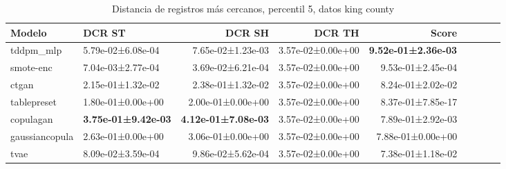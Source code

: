 \begin{table}[H]
\centering
\fontsize{10}{14}\selectfont
\caption{Distancia de registros más cercanos, percentil 5, datos king county}
\label{table-dcr-king county-a}
\begin{tabular}{|l|l|r|r|r|r|r|r|r|}
\hline
\rowcolor[gray]{0.8}
Modelo & DCR ST & DCR SH & DCR TH & \textbf{Score} \\
\hline tddpm\_mlp & 5.79e-02±6.08e-04 & 7.65e-02±1.23e-03 & 3.57e-02±0.00e+00 & \bfseries 9.52e-01±2.36e-03 \\
\hline smote-enc & \cellcolor[rgb]{0.9, 0.54, 0.52} 7.04e-03±2.77e-04 & \cellcolor[rgb]{0.9, 0.54, 0.52} 3.69e-02±6.21e-04 & 3.57e-02±0.00e+00 & 9.53e-01±2.45e-04 \\
\hline ctgan & 2.15e-01±1.32e-02 & 2.38e-01±1.32e-02 & 3.57e-02±0.00e+00 & 8.24e-01±2.02e-02 \\
\hline tablepreset & 1.80e-01±0.00e+00 & 2.00e-01±0.00e+00 & 3.57e-02±0.00e+00 & 8.37e-01±7.85e-17 \\
\hline copulagan & \bfseries 3.75e-01±9.42e-03 & \bfseries 4.12e-01±7.08e-03 & 3.57e-02±0.00e+00 & 7.89e-01±2.92e-03 \\
\hline gaussiancopula & 2.63e-01±0.00e+00 & 3.06e-01±0.00e+00 & 3.57e-02±0.00e+00 & 7.88e-01±0.00e+00 \\
\hline tvae & 8.09e-02±3.59e-04 & 9.86e-02±5.62e-04 & 3.57e-02±0.00e+00 & \cellcolor[rgb]{0.9, 0.54, 0.52} 7.38e-01±1.18e-02 \\
\hline
\end{tabular}
\end{table}
